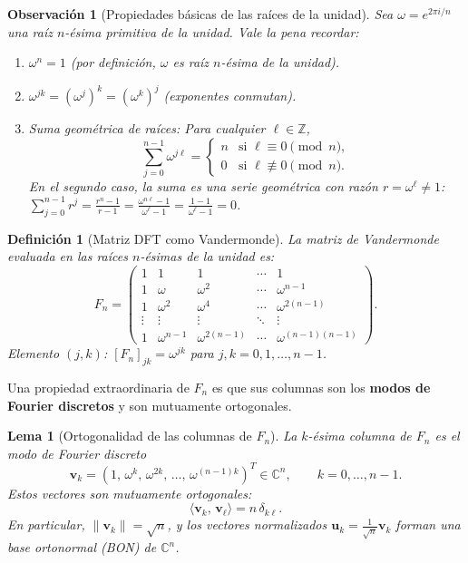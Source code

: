 \documentclass[a4paper,11pt]{report}
\newtheorem{lemma}[theorem]{Lema}
\newtheorem{definition}[theorem]{Definición}
\newtheorem{remark}[theorem]{Observación}
\begin{document}
\begin{remark}[Propiedades básicas de las raíces de la unidad]
Sea $\omega = e^{2\pi i/n}$ una raíz $n$-ésima primitiva de la unidad. Vale la pena recordar:
\begin{enumerate}
\item $\omega^n = 1$ (por definición, $\omega$ es raíz $n$-ésima de la unidad).
\item $\omega^{jk} = (\omega^j)^k = (\omega^k)^j$ (exponentes conmutan).
\item Suma geométrica de raíces: Para cualquier $\ell \in \mathbb{Z}$,
\[
\sum_{j=0}^{n-1} \omega^{j\ell} = \begin{cases}
n & \text{si } \ell \equiv 0 \pmod{n}, \\
0 & \text{si } \ell \not\equiv 0 \pmod{n}.
\end{cases}
\]
En el segundo caso, la suma es una serie geométrica con razón $r = \omega^\ell \neq 1$: $\sum_{j=0}^{n-1} r^j = \frac{r^n - 1}{r - 1} = \frac{\omega^{n\ell} - 1}{\omega^\ell - 1} = \frac{1 - 1}{\omega^\ell - 1} = 0$.
\end{enumerate}
\end{remark}

\begin{definition}[Matriz DFT como Vandermonde]\label{thm:dft_vandermonde}
La matriz de Vandermonde evaluada en las raíces $n$-ésimas de la unidad es:
\[
F_n = 
\begin{pmatrix}
1 & 1 & 1 & \cdots & 1 \\
1 & \omega & \omega^2 & \cdots & \omega^{n-1} \\
1 & \omega^2 & \omega^4 & \cdots & \omega^{2(n-1)} \\
\vdots & \vdots & \vdots & \ddots & \vdots \\
1 & \omega^{n-1} & \omega^{2(n-1)} & \cdots & \omega^{(n-1)(n-1)}
\end{pmatrix}.
\]
Elemento $(j,k)$: $[F_n]_{jk} = \omega^{jk}$ para $j, k = 0, 1, \ldots, n-1$.
\end{definition}

Una propiedad extraordinaria de $F_n$ es que sus columnas son los \textbf{modos de Fourier discretos} y son mutuamente ortogonales.

\begin{lemma}[Ortogonalidad de las columnas de $F_n$]\label{lem:modos_fourier}
La $k$-ésima columna de $F_n$ es el modo de Fourier discreto
\[
\mathbf{v}_k = (1,\, \omega^k,\, \omega^{2k},\, \ldots,\, \omega^{(n-1)k})^T \in \mathbb{C}^n, \qquad k = 0, \ldots, n-1.
\]
Estos vectores son mutuamente ortogonales:
\[
\langle \mathbf{v}_k,\, \mathbf{v}_\ell \rangle = n\,\delta_{k\ell}.
\]
En particular, $\|\mathbf{v}_k\| = \sqrt{n}$, y los vectores normalizados $\mathbf{u}_k = \frac{1}{\sqrt{n}}\mathbf{v}_k$ forman una base ortonormal (BON) de $\mathbb{C}^n$.
\end{lemma}
\end{document}
